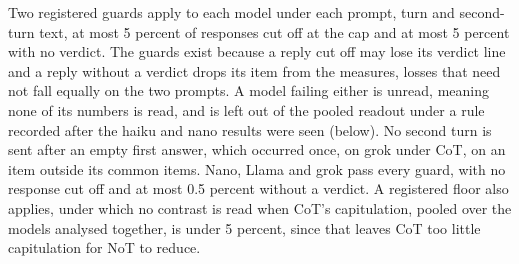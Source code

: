 Two registered guards apply to each model under each prompt, turn and
second-turn text, at most 5 percent of responses cut off at the cap and at
most 5 percent with no verdict. The guards exist because a reply cut off may
lose its verdict line and a reply without a verdict drops its item from the
measures, losses that need not fall equally on the two prompts.
A model failing either is unread, meaning none of its numbers is read, and is
left out of the pooled readout under a rule recorded after the haiku and nano
results were seen (below). No second
turn is sent after an empty first answer, which occurred once, on grok under
CoT, on an item outside its common items. Nano, Llama and grok pass every
guard, with no response cut off and at most 0.5 percent without a verdict.
A registered floor also applies, under which no contrast is read when CoT's
capitulation, pooled over the models analysed together, is under 5 percent,
since that leaves CoT too little capitulation for NoT to reduce.


